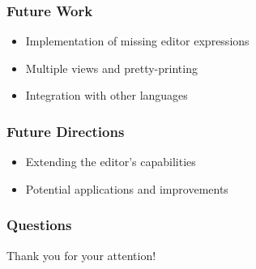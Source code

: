 \documentclass[t,24pt,aspectratio=169]{beamer}
\begin{document}
\begin{frame}[hvid]
    \frametitle{Future Work}
    \begin{itemize}
        \item Implementation of missing editor expressions
        \item Multiple views and pretty-printing
        \item Integration with other languages
    \end{itemize}
\end{frame}

\begin{frame}[hvid]
    \frametitle{Future Directions}
    \begin{itemize}
        \item Extending the editor's capabilities
        \item Potential applications and improvements
    \end{itemize}
\end{frame}

\begin{frame}[hvid]
    \frametitle{Questions}
    \centering
    \large{Thank you for your attention!}
\end{frame}
\end{document}
